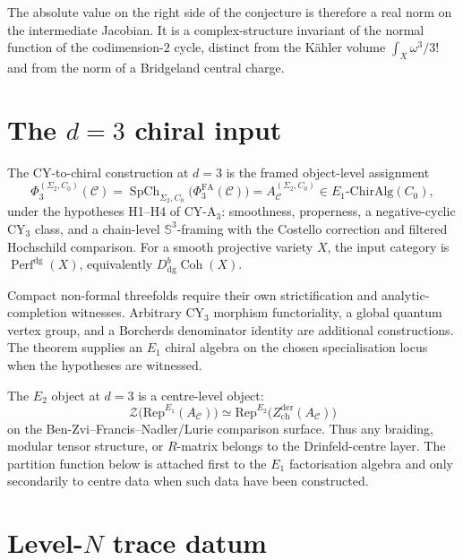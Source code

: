 \documentclass[11pt]{article}
\newcommand{\cC}{\mathcal{C}}
\begin{document}
The absolute value on the right side of the conjecture is therefore a
real norm on the intermediate Jacobian. It is a complex-structure
invariant of the normal function of the codimension-$2$ cycle, distinct
from the K\"ahler volume \(\int_X\omega^3/3!\) and from the norm of a
Bridgeland central charge.

\section{The \texorpdfstring{$d=3$}{d=3} chiral input}
\label{sec:d3-input}

The CY-to-chiral construction at $d=3$ is the framed object-level
assignment
\[
  \Phi_3^{(\Sigma_2,C_0)}(\cC)
  =
  \operatorname{SpCh}_{\Sigma_2,C_0}\bigl(\Phi^{\mathrm{FA}}_3(\cC)\bigr)
  =
  A_\cC^{(\Sigma_2,C_0)}
  \in E_1\text{-}\mathrm{ChirAlg}(C_0),
\]
under the hypotheses H1--H4 of CY-A$_3$: smoothness, properness,
a negative-cyclic CY$_3$ class, and a chain-level $\mathbb S^3$-framing
with the Costello correction and filtered Hochschild comparison. For a
smooth projective variety $X$, the input category is
$\operatorname{Perf}^{\mathrm{dg}}(X)$, equivalently
$D^b_{\mathrm{dg}}\operatorname{Coh}(X)$.

Compact non-formal threefolds require their own strictification and
analytic-completion witnesses. Arbitrary CY$_3$ morphism functoriality,
a global quantum vertex group, and a Borcherds denominator identity are
additional constructions. The theorem supplies an $E_1$ chiral algebra
on the chosen specialisation locus when the hypotheses are witnessed.

The $E_2$ object at $d=3$ is a centre-level object:
\[
  \mathcal Z\bigl(\mathrm{Rep}^{E_1}(A_\cC)\bigr)
  \simeq
  \mathrm{Rep}^{E_2}\bigl(Z^{\mathrm{der}}_{\mathrm{ch}}(A_\cC)\bigr)
\]
on the Ben-Zvi--Francis--Nadler/Lurie comparison surface. Thus any
braiding, modular tensor structure, or $R$-matrix belongs to the
Drinfeld-centre layer. The partition function below is attached first
to the $E_1$ factorisation algebra and only secondarily to centre data
when such data have been constructed.

\section{Level-\texorpdfstring{$N$}{N} trace datum}
\label{sec:trace}
\end{document}
